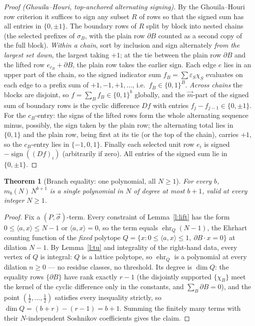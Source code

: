 \documentclass[11pt]{article}
\numberwithin{equation}{section}
\newtheorem{theorem}{Theorem}[section]
\theoremstyle{definition}
\theoremstyle{remark}
\begin{document}
\begin{proof}[Proof (Ghouila--Houri, top-anchored alternating
signing)]
By the Ghouila--Houri row criterion it suffices to sign any
subset $R$ of rows so that the signed sum has all entries in
$\{0,\pm1\}$. The boundary rows of $R$ split by block into
nested chains (the selected prefixes of $\sigma_B$, with the
plain row $\partial B$ counted as a second copy of the full
block). \emph{Within a chain}, sort by inclusion and sign
alternately \emph{from the largest set down}, the largest
taking $+1$; at the tie between the plain row $\partial B$
and the lifted row $e_{c_B}+\partial B$, the plain row takes
the earlier sign. Each edge $e$ lies in an upper part of the
chain, so the signed indicator sum
$f_B=\sum\varepsilon_S\chi_S$ evaluates on each edge to a
prefix sum of $+1,-1,+1,\dots$, i.e.\ $f_B\in\{0,1\}^{B}$.
\emph{Across chains} the blocks are disjoint, so
$f=\sum_Bf_B\in\{0,1\}^{b}$ globally, and the $\vec m$-part
of the signed sum of boundary rows is the cyclic difference
$Df$ with entries $f_j-f_{j-1}\in\{0,\pm1\}$. For the
$c_B$-entry: the signs of the lifted rows form the whole
alternating sequence minus, possibly, the sign taken by the
plain row; the alternating total lies in $\{0,1\}$ and the
plain row, being first at its tie (or the top of the chain),
carries $+1$, so the $c_B$-entry lies in $\{-1,0,1\}$.
Finally each selected unit row $e_i$ is signed
$-\operatorname{sign}((Df)_i)$ (arbitrarily if zero). All
entries of the signed sum lie in $\{0,\pm1\}$.
\end{proof}

\begin{theorem}[Branch equality: one polynomial, all
$N\ge1$]\label{t:poly}
For every $b$, $m_b(N)\,N^{b+1}$ is a single polynomial in
$N$ of degree at most $b+1$, valid at every integer
$N\ge1$.
\end{theorem}

\begin{proof}
Fix a $(P,\vec\sigma)$-term. Every constraint of
Lemma~\ref{l:lift} has the form $0\le\langle a,x\rangle\le
N-1$ or $\langle a,x\rangle=0$, so the term equals
$\operatorname{ehr}_Q(N-1)$, the Ehrhart counting function
of the \emph{fixed} polytope
$Q=\{x:0\le\langle a,x\rangle\le1,\ \partial B\cdot x=0\}$
at dilation $N-1$. By Lemma~\ref{l:tu} and integrality of
the right-hand data, every vertex of $Q$ is integral: $Q$ is
a lattice polytope, so $\operatorname{ehr}_Q$ is a
polynomial at every dilation $n\ge0$ --- no residue classes,
no threshold. Its degree is $\dim Q$: the equality rows
$\{\partial B\}$ have rank exactly $r-1$ (the disjointly
supported $\{\chi_B\}$ meet the kernel of the cyclic
difference only in the constants, and
$\sum_B\partial B=0$), and the point
$(\tfrac12,\dots,\tfrac12)$ satisfies every inequality
strictly, so $\dim Q=(b+r)-(r-1)=b+1$. Summing the finitely
many terms with their $N$-independent Soshnikov coefficients
gives the claim.
\end{proof}
\end{document}
